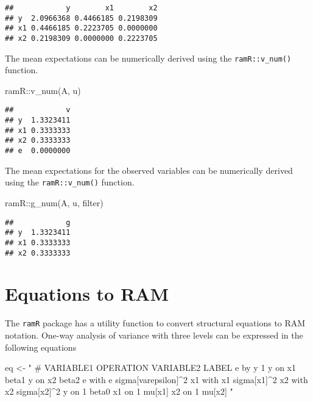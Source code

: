 \documentclass[
]{book}
\newenvironment{Shaded}{\begin{snugshade}}{\end{snugshade}}
\newcommand{\FunctionTok}[1]{\textcolor[rgb]{0.00,0.00,0.00}{#1}}
\newcommand{\NormalTok}[1]{#1}
\newcommand{\OtherTok}[1]{\textcolor[rgb]{0.56,0.35,0.01}{#1}}
\newcommand{\SpecialCharTok}[1]{\textcolor[rgb]{0.00,0.00,0.00}{#1}}
\newcommand{\StringTok}[1]{\textcolor[rgb]{0.31,0.60,0.02}{#1}}
\theoremstyle{definition}
\theoremstyle{definition}
\theoremstyle{definition}
\theoremstyle{remark}
\begin{document}
\begin{verbatim}
##            y        x1        x2
## y  2.0966368 0.4466185 0.2198309
## x1 0.4466185 0.2223705 0.0000000
## x2 0.2198309 0.0000000 0.2223705
\end{verbatim}

The mean expectations
can be numerically derived using the \texttt{ramR::v\_num()} function.

\begin{Shaded}
\begin{Highlighting}[]
\NormalTok{ramR}\SpecialCharTok{::}\FunctionTok{v\_num}\NormalTok{(A, u)}
\end{Highlighting}
\end{Shaded}

\begin{verbatim}
##            v
## y  1.3323411
## x1 0.3333333
## x2 0.3333333
## e  0.0000000
\end{verbatim}

The mean expectations for the observed variables
can be numerically derived using the \texttt{ramR::v\_num()} function.

\begin{Shaded}
\begin{Highlighting}[]
\NormalTok{ramR}\SpecialCharTok{::}\FunctionTok{g\_num}\NormalTok{(A, u, filter)}
\end{Highlighting}
\end{Shaded}

\begin{verbatim}
##            g
## y  1.3323411
## x1 0.3333333
## x2 0.3333333
\end{verbatim}

\hypertarget{equations-to-ram-1}{%
\section{Equations to RAM}\label{equations-to-ram-1}}

The \texttt{ramR} package has a utility function
to convert structural equations to RAM notation.
One-way analysis of variance with three levels
can be expressed in the following equations

\begin{Shaded}
\begin{Highlighting}[]
\NormalTok{eq }\OtherTok{\textless{}{-}} \StringTok{"}
\StringTok{  \# VARIABLE1 OPERATION VARIABLE2 LABEL}
\StringTok{  e           by        y         1}
\StringTok{  y           on        x1        beta1}
\StringTok{  y           on        x2        beta2}
\StringTok{  e           with      e         sigma[varepsilon]\^{}2}
\StringTok{  x1          with      x1        sigma[x1]\^{}2}
\StringTok{  x2          with      x2        sigma[x2]\^{}2}
\StringTok{  y           on        1         beta0}
\StringTok{  x1          on        1         mu[x1]}
\StringTok{  x2          on        1         mu[x2]}
\StringTok{"}
\end{Highlighting}
\end{Shaded}
\end{document}
